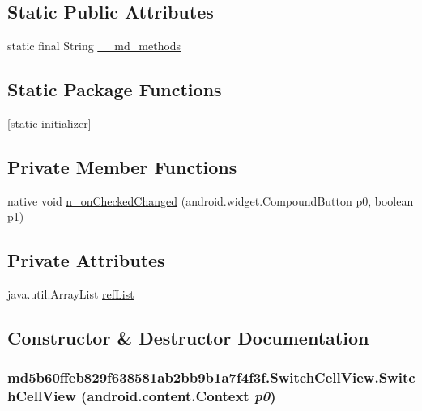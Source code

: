\subsection*{Static Public Attributes}
\begin{CompactItemize}
\item 
static final String \hyperlink{classmd5b60ffeb829f638581ab2bb9b1a7f4f3f_1_1_switch_cell_view_1153176f1114dedfcdc6c831e33adfea}{\_\-\_\-md\_\-methods}
\end{CompactItemize}
\subsection*{Static Package Functions}
\begin{CompactItemize}
\item 
\hyperlink{classmd5b60ffeb829f638581ab2bb9b1a7f4f3f_1_1_switch_cell_view_b1715a4890387a38bb406c97d7c77468}{\mbox{[}static initializer\mbox{]}}
\end{CompactItemize}
\subsection*{Private Member Functions}
\begin{CompactItemize}
\item 
native void \hyperlink{classmd5b60ffeb829f638581ab2bb9b1a7f4f3f_1_1_switch_cell_view_2b93ae01c4c3137f968f18538c1858d8}{n\_\-onCheckedChanged} (android.widget.CompoundButton p0, boolean p1)
\end{CompactItemize}
\subsection*{Private Attributes}
\begin{CompactItemize}
\item 
java.util.ArrayList \hyperlink{classmd5b60ffeb829f638581ab2bb9b1a7f4f3f_1_1_switch_cell_view_66bff703a87b9110a0b7ec44c8abfffb}{refList}
\end{CompactItemize}


\subsection{Constructor \& Destructor Documentation}
\hypertarget{classmd5b60ffeb829f638581ab2bb9b1a7f4f3f_1_1_switch_cell_view_1a542bccac4c26b5a04b987ac7471b91}{
\subsubsection[{SwitchCellView}]{\setlength{\rightskip}{0pt plus 5cm}md5b60ffeb829f638581ab2bb9b1a7f4f3f.SwitchCellView.SwitchCellView (android.content.Context {\em p0})}}
\label{classmd5b60ffeb829f638581ab2bb9b1a7f4f3f_1_1_switch_cell_view_1a542bccac4c26b5a04b987ac7471b91}



